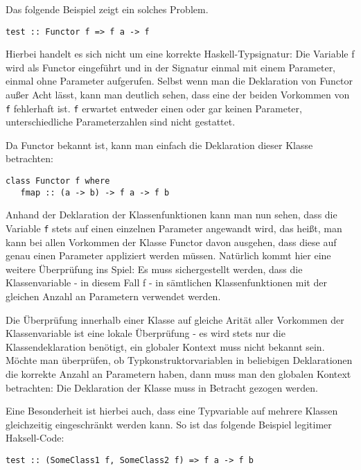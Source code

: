 Das folgende Beispiel zeigt ein solches Problem.

\begin{verbatim}
test :: Functor f => f a -> f
\end{verbatim}

Hierbei handelt es sich nicht um eine korrekte Haskell-Typsignatur: Die Variable f wird als Functor eingeführt und in der Signatur
einmal mit einem Parameter, einmal ohne Parameter aufgerufen. Selbst wenn man die Deklaration von Functor außer Acht lässt,
kann man deutlich sehen, dass eine der beiden Vorkommen von \texttt{f} fehlerhaft ist. \texttt{f} erwartet entweder einen
oder gar keinen Parameter, unterschiedliche Parameterzahlen sind nicht gestattet.

Da Functor bekannt ist, kann man einfach die Deklaration dieser Klasse betrachten:

\begin{verbatim}
class Functor f where
   fmap :: (a -> b) -> f a -> f b
\end{verbatim}

Anhand der Deklaration der Klassenfunktionen kann man nun sehen, dass die Variable \texttt{f} stets auf einen einzelnen 
Parameter angewandt wird, das heißt, man kann bei allen Vorkommen der Klasse Functor davon ausgehen, dass diese
auf genau einen Parameter appliziert werden müssen. Natürlich kommt hier eine weitere Überprüfung ins Spiel: Es muss
sichergestellt werden, dass die Klassenvariable - in diesem Fall f - in sämtlichen Klassenfunktionen mit der gleichen Anzahl an
Parametern verwendet werden.

Die Überprüfung innerhalb einer Klasse auf gleiche Arität aller Vorkommen der Klassenvariable ist eine lokale Überprüfung -
es wird stets nur die Klassendeklaration benötigt, ein globaler Kontext muss nicht bekannt sein. Möchte man überprüfen,
ob Typkonstruktorvariablen in beliebigen Deklarationen die korrekte Anzahl an Parametern haben, dann muss man den
globalen Kontext betrachten: Die Deklaration der Klasse muss in Betracht gezogen werden.

Eine Besonderheit ist hierbei auch, dass eine Typvariable auf mehrere Klassen gleichzeitig eingeschränkt werden kann. So ist
das folgende Beispiel legitimer Haksell-Code:

\begin{verbatim}
test :: (SomeClass1 f, SomeClass2 f) => f a -> f b
\end{verbatim}



